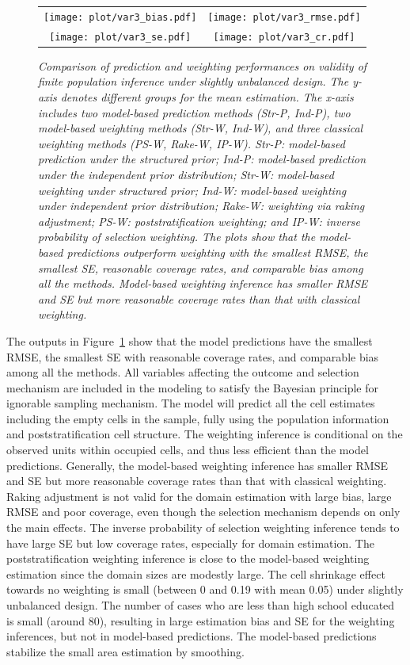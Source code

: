 \documentclass[11pt]{article}
\numberwithin{figure}{section}
\numberwithin{table}{section}
\numberwithin{equation}{section}
\begin{document}
\begin{figure} \centering \begin{tabular}{cc}
  \texttt{[image: plot/var3\_bias.pdf]}&
  \texttt{[image: plot/var3\_rmse.pdf]}\\
  \texttt{[image: plot/var3\_se.pdf]}&
  \texttt{[image: plot/var3\_cr.pdf]}\\ \end{tabular}
  \caption{\em Comparison of prediction and weighting performances on validity
  of finite population inference under slightly unbalanced design. The y-axis
  denotes different groups for the mean estimation. The x-axis includes two
  model-based prediction methods (Str-P, Ind-P), two model-based weighting
  methods (Str-W, Ind-W), and three classical weighting methods (PS-W, Rake-W,
  IP-W). Str-P: model-based prediction under the structured prior; Ind-P:
  model-based prediction under the independent prior distribution; Str-W:
  model-based weighting under structured prior; Ind-W: model-based weighting
  under independent prior distribution; Rake-W: weighting via raking
  adjustment; PS-W: poststratification weighting; and IP-W: inverse probability
  of selection weighting. The plots show that the model-based predictions
  outperform weighting with the smallest RMSE, the smallest SE, reasonable
  coverage rates, and comparable bias among all the methods. Model-based
  weighting inference has smaller RMSE and SE but more reasonable coverage
  rates than that with classical weighting.} \label{sim1} \end{figure}

The outputs in Figure~\ref{sim1} show that the model predictions have the
smallest RMSE, the smallest SE with reasonable coverage rates, and comparable
bias among all the methods. All variables affecting the outcome and selection
mechanism are included in the modeling to satisfy the Bayesian principle for
ignorable sampling mechanism. The model will predict all the cell estimates
including the empty cells in the sample, fully using the population information
and poststratification cell structure. The weighting inference is conditional
on the observed units within occupied cells, and thus less efficient than the
model predictions. Generally, the model-based weighting inference has smaller
RMSE and SE but more reasonable coverage rates than that with classical
weighting. Raking adjustment is not valid for the domain estimation with large
bias, large RMSE and poor coverage, even though the selection mechanism depends
on only the main effects. The inverse probability of selection weighting
inference tends to have large SE but low coverage rates, especially for domain
estimation. The poststratification weighting inference is close to the
model-based weighting estimation since the domain sizes are modestly large. The
cell shrinkage effect towards no weighting is small (between 0 and 0.19 with
mean 0.05) under slightly unbalanced design. The number of cases who are less
than high school educated is small (around 80), resulting in large estimation
bias and SE for the weighting inferences, but not in model-based predictions.
The model-based predictions stabilize the small area estimation by smoothing.
\end{document}
